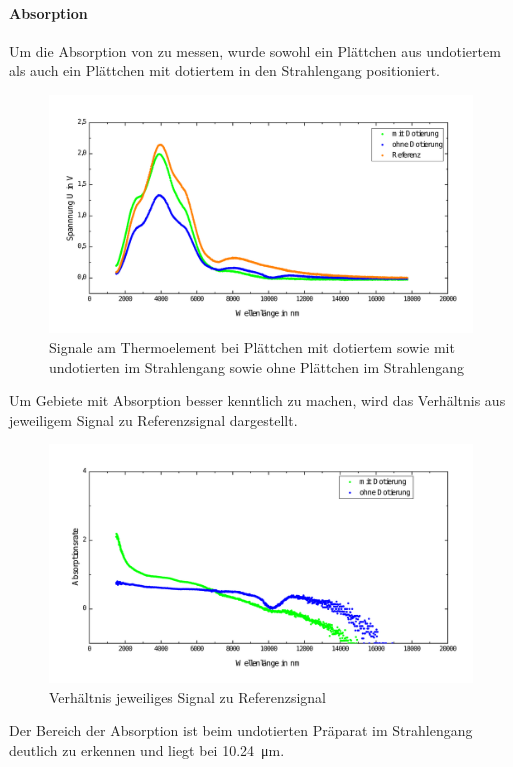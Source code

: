 \documentclass[a4paper,twoside,final]{article}
\begin{document}
\paragraph{Absorption}
Um die Absorption von  zu messen, wurde sowohl ein Plättchen aus undotiertem als auch ein Plättchen mit dotiertem  in den Strahlengang positioniert.
\begin{figure}[htp]
  \centering
    \includegraphics[width=\textwidth]{Bilder/AbsorptionSiO2.pdf}
    \caption{Signale am Thermoelement bei Plättchen mit dotiertem sowie mit undotierten  im Strahlengang sowie ohne Plättchen im Strahlengang}
\end{figure}
Um Gebiete mit Absorption besser kenntlich zu machen, wird das Verhältnis aus jeweiligem Signal zu Referenzsignal dargestellt.

\begin{figure}[htp]
  \centering
    \includegraphics[width=\textwidth]{Bilder/Absorptionsrate_Si02.pdf}
    \caption{Verhältnis jeweiliges Signal zu Referenzsignal}
\end{figure}
\FloatBarrier
Der Bereich der Absorption ist beim undotierten Präparat im Strahlengang deutlich zu erkennen und liegt bei \SI{10.24}{\micro\meter}.
\end{document}
